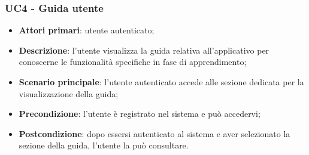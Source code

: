 \subsubsection{UC4 - Guida utente}
\begin{itemize}
	\item \textbf{Attori primari}: utente autenticato;
	\item \textbf{Descrizione}: l'utente visualizza la guida relativa all'applicativo per conoscerne le funzionalità specifiche in fase di apprendimento;
	\item \textbf{Scenario principale}: l'utente autenticato accede alle sezione dedicata per la visualizzazione della guida;
	\item \textbf{Precondizione}: l'utente è registrato nel sistema e può accedervi;
	\item \textbf{Postcondizione}: dopo essersi autenticato al sistema e aver selezionato la sezione della guida, l'utente la può consultare.
\end{itemize}   